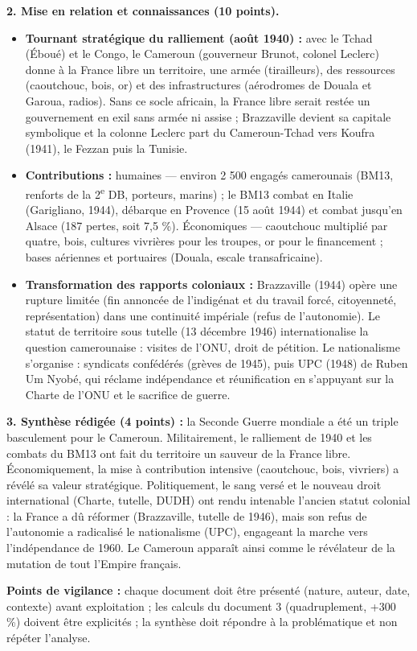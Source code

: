\documentclass[11pt]{article}
\begin{document}
\begin{corrige}
\textbf{2. Mise en relation et connaissances (10 points).}
\begin{itemize}
\item[a.] \textbf{Tournant stratégique du ralliement (août 1940) :} avec le Tchad (Éboué) et le Congo, le Cameroun (gouverneur Brunot, colonel Leclerc) donne à la France libre un territoire, une armée (tirailleurs), des ressources (caoutchouc, bois, or) et des infrastructures (aérodromes de Douala et Garoua, radios). Sans ce socle africain, la France libre serait restée un gouvernement en exil sans armée ni assise ; Brazzaville devient sa capitale symbolique et la colonne Leclerc part du Cameroun-Tchad vers Koufra (1941), le Fezzan puis la Tunisie.
\item[b.] \textbf{Contributions :} humaines --- environ 2 500 engagés camerounais (BM13, renforts de la 2\textsuperscript{e} DB, porteurs, marins) ; le BM13 combat en Italie (Garigliano, 1944), débarque en Provence (15 août 1944) et combat jusqu'en Alsace (187 pertes, soit 7,5 \%). Économiques --- caoutchouc multiplié par quatre, bois, cultures vivrières pour les troupes, or pour le financement ; bases aériennes et portuaires (Douala, escale transafricaine).
\item[c.] \textbf{Transformation des rapports coloniaux :} Brazzaville (1944) opère une rupture limitée (fin annoncée de l'indigénat et du travail forcé, citoyenneté, représentation) dans une continuité impériale (refus de l'autonomie). Le statut de territoire sous tutelle (13 décembre 1946) internationalise la question camerounaise : visites de l'ONU, droit de pétition. Le nationalisme s'organise : syndicats confédérés (grèves de 1945), puis UPC (1948) de Ruben Um Nyobé, qui réclame indépendance et réunification en s'appuyant sur la Charte de l'ONU et le sacrifice de guerre.
\end{itemize}

\textbf{3. Synthèse rédigée (4 points) :} la Seconde Guerre mondiale a été un triple basculement pour le Cameroun. Militairement, le ralliement de 1940 et les combats du BM13 ont fait du territoire un sauveur de la France libre. Économiquement, la mise à contribution intensive (caoutchouc, bois, vivriers) a révélé sa valeur stratégique. Politiquement, le sang versé et le nouveau droit international (Charte, tutelle, DUDH) ont rendu intenable l'ancien statut colonial : la France a dû réformer (Brazzaville, tutelle de 1946), mais son refus de l'autonomie a radicalisé le nationalisme (UPC), engageant la marche vers l'indépendance de 1960. Le Cameroun apparaît ainsi comme le révélateur de la mutation de tout l'Empire français.

\textbf{Points de vigilance :} chaque document doit être présenté (nature, auteur, date, contexte) avant exploitation ; les calculs du document 3 (quadruplement, +300 \%) doivent être explicités ; la synthèse doit répondre à la problématique et non répéter l'analyse.
\end{corrige}
\end{document}
